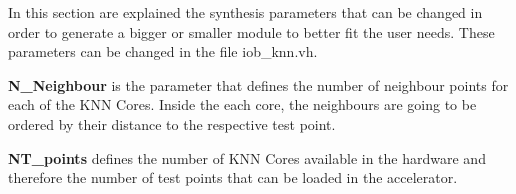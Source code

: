 In this section are explained the synthesis parameters that can be changed in
order to generate a bigger or smaller module to better fit the user needs.
These parameters can be changed in the file iob\_knn.vh.

\noindent \textbf{N\_Neighbour} is the parameter that defines the number of neighbour points for each of the KNN Cores. Inside the each core, the neighbours are going to be ordered by their distance to the respective test point.

\noindent \textbf{NT\_points} defines the number of KNN Cores available in the hardware and therefore the number of test points that can be loaded in the accelerator.

